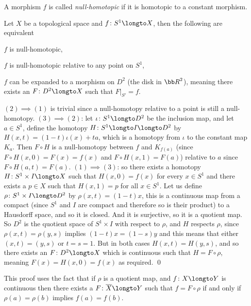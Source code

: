 \eexam

A morphism $f$ is called {\it null-homotopic} if it is homotopic to a constant morphism.

\bprop

    Let $X$ be a topological space and $f\colon S^1\longto X$, then the following are equivalent
    \benum
        \item $f$ is null-homotopic,
        \item $f$ is null-homotopic relative to any point on $S^1$,
        \item $f$ can be expanded to a morphism on $D^2$ (the disk in ${\bb R}^2$), meaning there exists an $F\colon D^2\longto X$ such that $F\bigr|_{S'}=f$.
    \eenum

\eprop

$(2)\implies(1)$ is trivial since a null-homotopy relative to a point is still a null-homotopy.
$(3)\implies(2)$: let $\iota\colon S^1\longto D^2$ be the inclusion map, and let $a\in S^1$, define the homotopy $H\colon S^1\longto I\longto D^2$ by $H(x,t)=(1-t)\iota(x)+ta$, which is a homotopy from
$\iota$ to the constant map $K_a$.
Then $F\circ H$ is a null-homotopy between $f$ and $K_{f(a)}$ (since $F\circ H(x,0)=F(x)=f(x)$ and $F\circ H(x,1)=F(a)$) relative to $a$ since $F\circ H(a,t)=F(a)$.
$(1)\implies(3)$: so there exists a homotopy $H\colon S^1\times I\longto X$ such that $H(x,0)=f(x)$ for every $x\in S^1$ and there exists a $p\in X$ such that $H(x,1)=p$ for all $x\in S^1$.
Let us define $\rho\colon S^1\times I\longto D^2$ by $\rho(x,t)=(1-t)x$, this is a continuous map from a compact (since $S^1$ and $I$ are compact and therefore so is their product) to a Hausdorff space, and
so it is closed.
And it is surjective, so it is a quotient map.
So $D^2$ is the quotient space of $S^1\times I$ with respect to $\rho$, and $H$ respects $\rho$, since $\rho(x,t)=\rho(y,s)$ implies $(1-t)x=(1-s)y$ and this means that either $(x,t)=(y,s)$ or $t=s=1$.
But in both cases $H(x,t)=H(y,s)$, and so there exists an $F\colon D^2\longto X$ which is continuous such that $H=F\circ\rho$, meaning $F(x)=H(x,0)=f(x)$ as required.
\qed

This proof uses the fact that if $\rho$ is a quotient map, and $f\colon X\longto Y$ is continuous then there exists a $F\colon\overline X\longto Y$ such that $f=F\circ\rho$ if and only if $\rho(a)=\rho(b)$
implies $f(a)=f(b)$.


